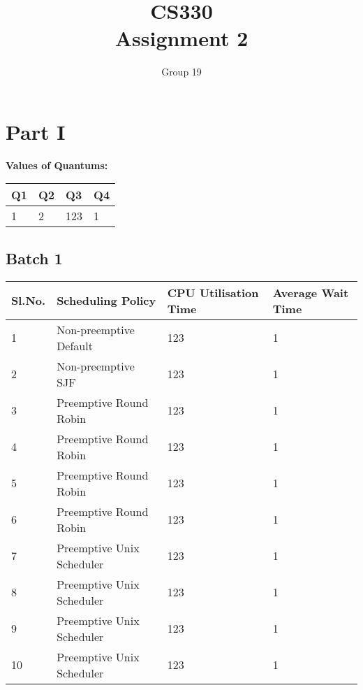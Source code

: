 \documentclass{article}
\author{Group 19}
\title{CS330 \\ Assignment 2}
\date{}
\begin{document}
\maketitle
\section{Part I}
\textbf{Values of Quantums:}\\

    \begin{tabular}{| l | l | l | l |}
    \hline
    Q1 & Q2 & Q3 & Q4 \\ \hline
    1 & 2 & 123 & 1 \\
    \hline
    \end{tabular}


\subsection{Batch 1}
    \begin{center}
    \begin{tabular}{| l | l | l | l |}
    \hline
    Sl.No. & Scheduling Policy & CPU Utilisation Time & Average Wait Time \\ \hline
    1 & Non-preemptive Default & 123 & 1 \\
    2 & Non-preemptive SJF & 123 & 1 \\
    3 & Preemptive Round Robin & 123 & 1 \\
    4 & Preemptive Round Robin & 123 & 1 \\
    5 & Preemptive Round Robin & 123 & 1 \\
    6 & Preemptive Round Robin & 123 & 1 \\
    7 & Preemptive Unix Scheduler & 123 & 1 \\
    8 & Preemptive Unix Scheduler & 123 & 1 \\
    9 & Preemptive Unix Scheduler & 123 & 1 \\
    10 & Preemptive Unix Scheduler & 123 & 1 \\
    \hline
    \end{tabular}
    \end{center}
\end{document}
